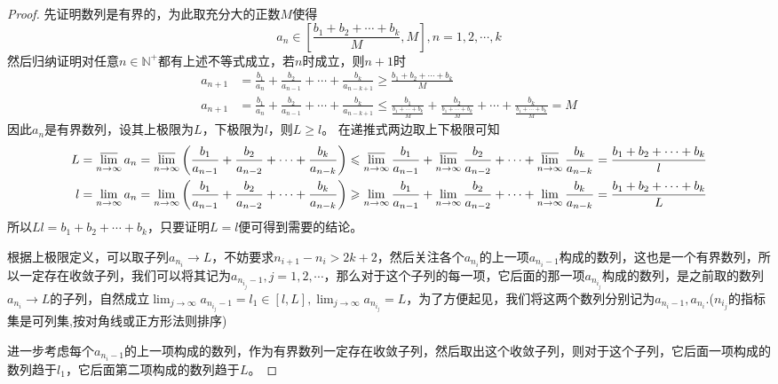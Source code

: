 \documentclass[../../main.tex]{subfiles}
\begin{document}
\begin{proof}
先证明数列是有界的，为此取充分大的正数\(M\)使得
\[a_n\in\left[\frac{b_1 + b_2+\cdots + b_k}{M},M\right],n = 1,2,\cdots,k\]
然后归纳证明对任意\(n\in\mathbb{N}^+\)都有上述不等式成立，若\(n\)时成立，则\(n + 1\)时
\begin{align*}
a_{n + 1}&=\frac{b_1}{a_n}+\frac{b_2}{a_{n - 1}}+\cdots+\frac{b_k}{a_{n - k+1}}\geqslant \frac{b_1 + b_2+\cdots + b_k}{M}\\
a_{n + 1}&=\frac{b_1}{a_n}+\frac{b_2}{a_{n - 1}}+\cdots+\frac{b_k}{a_{n - k+1}}\leqslant \frac{b_1}{\frac{b_1 + \cdots + b_k}{M}}+\frac{b_2}{\frac{b_1 + \cdots + b_k}{M}}+\cdots+\frac{b_k}{\frac{b_1 + \cdots + b_k}{M}}=M
\end{align*}
因此\(a_n\)是有界数列，设其上极限为\(L\)，下极限为\(l\)，则\(L\geqslant  l\)。
在递推式两边取上下极限可知
\begin{align*}
L&=\varlimsup_{n\rightarrow\infty}a_n=\varlimsup_{n\rightarrow\infty}\left(\frac{b_1}{a_{n - 1}}+\frac{b_2}{a_{n - 2}}+\cdots+\frac{b_k}{a_{n - k}}\right)\leqslant \varlimsup_{n\rightarrow\infty}\frac{b_1}{a_{n - 1}}+\varlimsup_{n\rightarrow\infty}\frac{b_2}{a_{n - 2}}+\cdots+\varlimsup_{n\rightarrow\infty}\frac{b_k}{a_{n - k}}=\frac{b_1 + b_2+\cdots + b_k}{l}\\
l&=\lim_{n\rightarrow\infty}a_n=\lim_{n\rightarrow\infty}\left(\frac{b_1}{a_{n - 1}}+\frac{b_2}{a_{n - 2}}+\cdots+\frac{b_k}{a_{n - k}}\right)\geqslant \lim_{n\rightarrow\infty}\frac{b_1}{a_{n - 1}}+\lim_{n\rightarrow\infty}\frac{b_2}{a_{n - 2}}+\cdots+\lim_{n\rightarrow\infty}\frac{b_k}{a_{n - k}}=\frac{b_1 + b_2+\cdots + b_k}{L}
\end{align*}
所以\(Ll=b_1 + b_2+\cdots + b_k\)，只要证明\(L = l\)便可得到需要的结论。

根据上极限定义，可以取子列\(a_{n_i}\to L\)，不妨要求\(n_{i + 1}-n_i>2k + 2\)，然后关注各个\(a_{n_i}\)的上一项\(a_{n_i - 1}\)构成的数列，这也是一个有界数列，所以一定存在收敛子列，我们可以将其记为\(a_{n_{i_j}-1},j = 1,2,\cdots\)，那么对于这个子列的每一项，它后面的那一项\(a_{n_{i_j}}\)构成的数列，是之前取的数列\(a_{n_i}\to L\)的子列，自然成立\(\lim_{j\rightarrow\infty}a_{n_{i_j}-1}=l_1\in[l,L],\lim_{j\rightarrow\infty}a_{n_{i_j}} = L\)，为了方便起见，我们将这两个数列分别记为\(a_{n_{i}-1},a_{n_{i}}\).($n_{i_j}$的指标集是可列集,按对角线或正方形法则排序)

进一步考虑每个\(a_{n_{i}-1}\)的上一项构成的数列，作为有界数列一定存在收敛子列，然后取出这个收敛子列，则对于这个子列，它后面一项构成的数列趋于\(l_1\)，它后面第二项构成的数列趋于\(L\)。


\end{proof}
\end{document}
